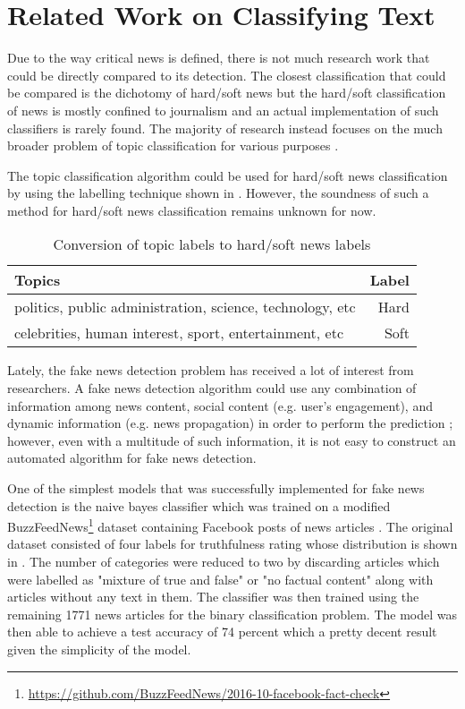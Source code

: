 \section{Related Work on Classifying Text} \label{related_works}
Due to the way critical news is defined, there is not much research work that could be directly compared to its detection. The closest classification that could be compared is the dichotomy of hard/soft news but the hard/soft classification of news is mostly confined to journalism and an actual implementation of such classifiers is rarely found. The majority of research instead focuses on the much broader problem of topic classification for various purposes \cite{wang2012baselines, lee2011twitter, joachims1998text, nigam2000text}.

The topic classification algorithm could be used for hard/soft news classification by using the labelling technique shown in . However, the soundness of such a method for hard/soft news classification remains unknown for now.

\begin{table}[h]
\begin{center}
\caption{Conversion of topic labels to hard/soft news labels}
\label{tbl:topics_to_hard_soft}
\begin{tabular}{lr}
\toprule 
Topics&Label \\
\midrule 
politics, public administration, science, technology, etc & Hard\\
\hline
celebrities, human interest, sport, entertainment, etc & Soft\\
\bottomrule
\end{tabular}
\end{center}
\end{table}

Lately, the fake news detection problem has received a lot of interest from researchers. A fake news detection algorithm could use any combination of information among news content, social content (e.g. user's engagement), and dynamic information (e.g. news propagation) in order to perform the prediction \cite{shu2018fakenewsnet}; however, even with a multitude of such information, it is not easy to construct an automated algorithm for fake news detection\cite{shu2017fake}.

One of the simplest models that was successfully implemented for fake news detection is the naive bayes classifier which was trained on a modified BuzzFeedNews\footnote{\url{https://github.com/BuzzFeedNews/2016-10-facebook-fact-check}} dataset containing Facebook posts of news articles \cite{granik2017fake}. The original dataset consisted of four labels for truthfulness rating whose distribution is shown in . The number of categories were reduced to two by discarding articles which were labelled as "mixture of true and false" or "no factual content" along with articles without any text in them. The classifier was then trained using the remaining 1771 news articles for the binary classification problem. The model was then able to achieve a test accuracy of 74 percent which a pretty decent result given the simplicity of the model.

